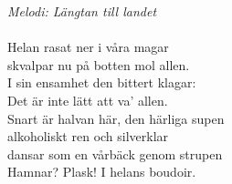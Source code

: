 {\footnotesize\textit{Melodi: Längtan till landet}}\\
\\
Helan rasat ner i våra magar\\
skvalpar nu på botten mol allen.\\
I sin ensamhet den bittert klagar:\\
Det är inte lätt att va' allen.\\
Snart är halvan här, den härliga supen\\
alkoholiskt ren och silverklar\\
dansar som en vårbäck genom strupen\\
Hamnar? Plask! I helans boudoir.
